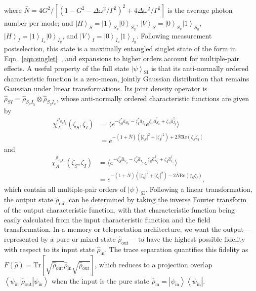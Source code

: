 \documentclass[aps,twocolumn,secnumarabic,amsmath,amssymb,pra,groupedaddress,
showpacs, showkeys,draft]{revtex4-1}
\newcommand{\bra}[1]{\left\langle #1 \right|}
\newcommand{\ket}[1]{\left|#1\right\rangle}
\newcommand{\pna}[1]{\left(#1\right)}
\newcommand{\pnb}[1]{\left[#1\right]}
\begin{document}
where $\bar{N}=4G^2/\pnb{\pna{1-G^2-\Delta
    \omega^2/\Gamma^2}^2+4\Delta\omega^2/\Gamma^2}$ is the average photon
number per mode; and $\ket{H}_S=\ket{1}_{S_x}\ket{0}_{S_y}$,
$\ket{V}_S=\ket{0}_{S_x}\ket{1}_{S_y}$, $\ket{H}_I=\ket{1}_{I_x}\ket{0}_{I_y}$,
and $\ket{V}_I=\ket{0}_{I_x}\ket{1}_{I_y}$. Following measurement
postselection, this state is a maximally entangled singlet state of the form in
Eqn.~\ref{eqn:singlet}~\cite{1367-2630-4-1-347}, and expansions to higher
orders account for multiple-pair effects. A useful property of the full state
$\ket{\psi}_{\textrm{SI}}$ is that its anti-normally ordered characteristic
function is a zero-mean, jointly Gaussian distribution that remains Gaussian
under linear transformations. Its joint density operator is
$\hat{\rho}_{SI}=\hat{\rho}_{S_x I_y}\otimes\hat{\rho}_{S_y I_x}$, whose
anti-normally ordered characteristic functions are given by
\begin{align} 
\chi_A^{\rho_{S_x I_y}}\pna{\zeta_S,\zeta_I} & = \langle e^{-\zeta_S^* \hat{a}_{S_x}-\zeta_I^* \hat{a}_{I_y}} e^{\zeta_S \hat{a}_{S_x}^{\dagger}+\zeta_S \hat{a}_{I_y}^{\dagger}} \rangle \nonumber \\
& = e^{-\pna{1+\bar{N}}\pna{|\zeta_S|^2+|\zeta_I|^2}+2\bar{N}\textrm{Re}\pna{\zeta_S \zeta_I}}
\end{align}
and 	
\begin{align}
\chi_A^{\rho_{S_y I_x}}\pna{\zeta_S,\zeta_I} & = \langle e^{-\zeta_S^* \hat{a}_{S_y}-\zeta_I^* \hat{a}_{I_x}} e^{\zeta_S \hat{a}_{S_y}^{\dagger}+\zeta_I \hat{a}_{I_x}^{\dagger}} \rangle \nonumber \\
& = e^{-\pna{1+\bar{N}}\pna{|\zeta_S|^2+|\zeta_I|^2}-2\bar{N}\textrm{Re}\pna{\zeta_S \zeta_I}},
\end{align}
which contain all multiple-pair orders of $\ket{\psi}_{\textrm{SI}}$. Following
a linear transformation, the output state $\hat{\rho}_{\textrm{out}}$ can be
determined by taking the inverse Fourier transform of the output characteristic
function, with that characteristic function being easily calculated from the
input characteristic function and the field transformation. In a memory or
teleportation architecture, we want the output---represented by a pure or mixed
state $\hat{\rho}_{\textrm{out}}$--- to have the highest possible fidelity with
respect to its input state $\hat{\rho}_{\textrm{in}}$. The trace separation
quantifies this fidelity as
$F\pna{\hat{\rho}}=\textrm{Tr}\pnb{\sqrt{\hat{\rho}_{\textrm{out}}}\hat{\rho}_{\textrm{in}}
  \sqrt{\hat{\rho}_{\textrm{out}}}}$, which reduces to a projection overlap
${\bra{\psi_{\textrm{in}}} \hat{\rho}_{\textrm{out}} \ket{\psi_{\textrm{in}}}}$
when the input is the pure state
$\hat{\rho}_{\textrm{in}}=\ket{\psi_{\textrm{in}}} \bra{\psi_{\textrm{in}}}$.
\end{document}
